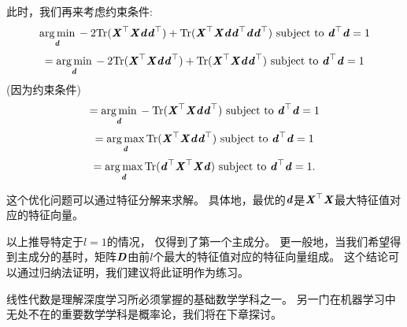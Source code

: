 
此时，我们再来考虑约束条件:
\begin{equation}
    \underset{\Vd}{\arg\min} \, - 2\Tr(\MX^\top\MX \Vd\Vd^\top) + \Tr(\MX^\top\MX\Vd\Vd^\top\Vd\Vd^\top )
    \text{ subject to } \Vd^\top \Vd = 1
\end{equation}
\begin{equation}
    = \underset{\Vd}{\arg\min} \, - 2\Tr(\MX^\top\MX \Vd \Vd^\top) + \Tr(\MX^\top\MX\Vd\Vd^\top )
    \text{ subject to } \Vd^\top \Vd = 1
\end{equation}
 (因为约束条件)
 \begin{equation}
     = \underset{\Vd}{\arg\min} \, - \Tr(\MX^\top\MX \Vd\Vd^\top)
     \text{ subject to } \Vd^\top \Vd = 1
 \end{equation}
 \begin{equation}
     = \underset{\Vd}{\arg\max} \, \Tr(\MX^\top\MX \Vd\Vd^\top)
     \text{ subject to } \Vd^\top \Vd = 1
 \end{equation}
 \begin{equation}
     = \underset{\Vd}{\arg\max} \, \Tr(\Vd^\top\MX^\top\MX \Vd)
     \text{ subject to } \Vd^\top \Vd = 1 .
 \end{equation}


这个优化问题可以通过特征分解来求解。
具体地，最优的$\Vd$是$\MX^\top\MX$最大特征值对应的特征向量。


以上推导特定于$l=1$的情况， 仅得到了第一个主成分。
更一般地，当我们希望得到主成分的基时，矩阵$\MD$由前$l$个最大的特征值对应的特征向量组成。
这个结论可以通过归纳法证明，我们建议将此证明作为练习。


线性代数是理解深度学习所必须掌握的基础数学学科之一。
另一门在机器学习中无处不在的重要数学学科是概率论，我们将在下章探讨。



